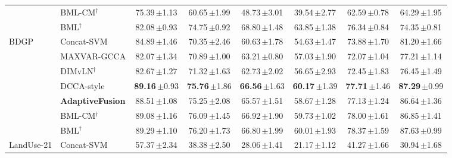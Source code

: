 \begin{table}[!t]
\begin{tabular}{llcccccc}
\cmidrule(lr){2-8}
 & BML-CM$^\dagger$ & 75.39\,{\scriptsize$\pm$1.13} & 60.65\,{\scriptsize$\pm$1.99} & 48.73\,{\scriptsize$\pm$3.01} & 39.54\,{\scriptsize$\pm$2.77} & 62.59\,{\scriptsize$\pm$0.78} & 64.29\,{\scriptsize$\pm$1.95} \\
 & BML$^\dagger$ & 82.08\,{\scriptsize$\pm$0.93} & 74.75\,{\scriptsize$\pm$0.92} & 68.80\,{\scriptsize$\pm$1.48} & 63.85\,{\scriptsize$\pm$1.38} & 76.34\,{\scriptsize$\pm$0.84} & 74.35\,{\scriptsize$\pm$0.81} \\
\midrule
\multirow{7}{*}{BDGP} & Concat-SVM & 84.89\,{\scriptsize$\pm$1.46} & 70.35\,{\scriptsize$\pm$2.46} & 60.63\,{\scriptsize$\pm$1.78} & 54.63\,{\scriptsize$\pm$1.47} & 73.88\,{\scriptsize$\pm$1.70} & 81.20\,{\scriptsize$\pm$1.66} \\
 & MAXVAR-GCCA & 82.07\,{\scriptsize$\pm$1.34} & 70.89\,{\scriptsize$\pm$1.00} & 63.21\,{\scriptsize$\pm$0.80} & 57.03\,{\scriptsize$\pm$1.90} & 72.07\,{\scriptsize$\pm$1.04} & 77.21\,{\scriptsize$\pm$1.14} \\
 & DIMvLN$^\dagger$ & 82.67\,{\scriptsize$\pm$1.27} & 71.32\,{\scriptsize$\pm$1.63} & 62.73\,{\scriptsize$\pm$2.02} & 56.65\,{\scriptsize$\pm$2.93} & 72.45\,{\scriptsize$\pm$1.83} & 76.45\,{\scriptsize$\pm$1.49} \\
 & DCCA-style & \textbf{89.16}\,{\scriptsize$\pm$0.93} & \textbf{75.76}\,{\scriptsize$\pm$1.86} & \textbf{66.56}\,{\scriptsize$\pm$1.63} & \textbf{60.17}\,{\scriptsize$\pm$1.39} & \textbf{77.71}\,{\scriptsize$\pm$1.46} & \textbf{87.29}\,{\scriptsize$\pm$0.99} \\
 & \textbf{AdaptiveFusion} & 88.51\,{\scriptsize$\pm$1.08} & 75.25\,{\scriptsize$\pm$2.08} & 65.57\,{\scriptsize$\pm$1.51} & 58.67\,{\scriptsize$\pm$1.28} & 77.13\,{\scriptsize$\pm$1.24} & 86.64\,{\scriptsize$\pm$1.36} \\
\cmidrule(lr){2-8}
 & BML-CM$^\dagger$ & 89.08\,{\scriptsize$\pm$1.16} & 76.09\,{\scriptsize$\pm$1.45} & 66.92\,{\scriptsize$\pm$1.90} & 59.73\,{\scriptsize$\pm$1.02} & 78.00\,{\scriptsize$\pm$1.61} & 86.85\,{\scriptsize$\pm$1.41} \\
 & BML$^\dagger$ & 89.29\,{\scriptsize$\pm$1.10} & 76.20\,{\scriptsize$\pm$1.73} & 66.80\,{\scriptsize$\pm$1.99} & 60.01\,{\scriptsize$\pm$1.93} & 78.37\,{\scriptsize$\pm$1.59} & 87.63\,{\scriptsize$\pm$0.99} \\
\midrule
\multirow{7}{*}{LandUse-21} & Concat-SVM & 57.37\,{\scriptsize$\pm$2.34} & 38.38\,{\scriptsize$\pm$2.50} & 28.06\,{\scriptsize$\pm$1.41} & 21.17\,{\scriptsize$\pm$1.12} & 41.27\,{\scriptsize$\pm$1.66} & 30.94\,{\scriptsize$\pm$1.68} \\

\end{tabular}
\end{table}
